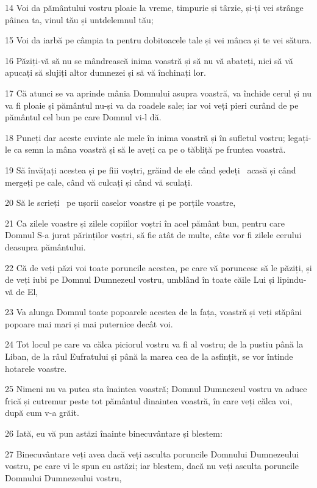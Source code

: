 \par 14 Voi da pământului vostru ploaie la vreme, timpurie și târzie, și-ți vei strânge pâinea ta, vinul tău și untdelemnul tău;
\par 15 Voi da iarbă pe câmpia ta pentru dobitoacele tale și vei mânca și te vei sătura.
\par 16 Păziți-vă să nu se mândrească inima voastră și să nu vă abateți, nici să vă apucați să slujiți altor dumnezei și să vă închinați lor.
\par 17 Că atunci se va aprinde mânia Domnului asupra voastră, va închide cerul și nu va fi ploaie și pământul nu-și va da roadele sale; iar voi veți pieri curând de pe pământul cel bun pe care Domnul vi-l dă.
\par 18 Puneți dar aceste cuvinte ale mele în inima voastră și în sufletul vostru; legați-le ca semn la mâna voastră și să le aveți ca pe o tăbliță pe fruntea voastră.
\par 19 Să învățați acestea și pe fiii voștri, grăind de ele când ședeți  acasă și când mergeți pe cale, când vă culcați și când vă sculați.
\par 20 Să le scrieți  pe ușorii caselor voastre și pe porțile voastre,
\par 21 Ca zilele voastre și zilele copiilor voștri în acel pământ bun, pentru care Domnul S-a jurat părinților voștri, să fie atât de multe, câte vor fi zilele cerului deasupra pământului.
\par 22 Că de veți păzi voi toate poruncile acestea, pe care vă poruncesc să le păziți, și de veți iubi pe Domnul Dumnezeul vostru, umblând în toate căile Lui și lipindu-vă de El,
\par 23 Va alunga Domnul toate popoarele acestea de la fața, voastră și veți stăpâni popoare mai mari și mai puternice decât voi.
\par 24 Tot locul pe care va călca piciorul vostru va fi al vostru; de la pustiu până la Liban, de la râul Eufratului și până la marea cea de la asfințit, se vor întinde hotarele voastre.
\par 25 Nimeni nu va putea sta înaintea voastră; Domnul Dumnezeul vostru va aduce frică și cutremur peste tot pământul dinaintea voastră, în care veți călca voi, după cum v-a grăit.
\par 26 Iată, eu vă pun astăzi înainte binecuvântare și blestem:
\par 27 Binecuvântare veți avea dacă veți asculta poruncile Domnului Dumnezeului vostru, pe care vi le spun eu astăzi; iar blestem, dacă nu veți asculta poruncile Domnului Dumnezeului vostru,
